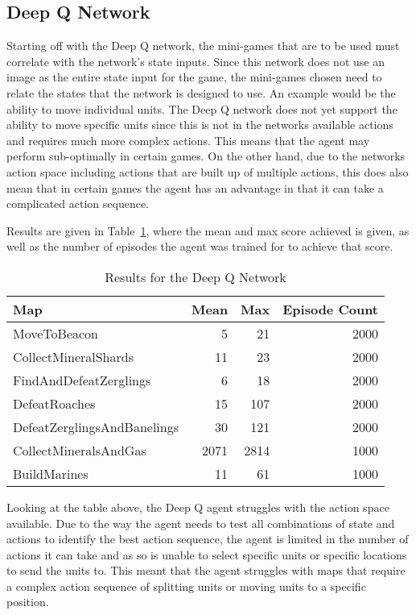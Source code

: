 \subsection{Deep Q Network}

Starting off with the Deep Q network, the mini-games that are to be used must
correlate with the network's state inputs. Since this network does not use an
image as the entire state input for the game, the mini-games chosen need to
relate the states that the network is designed to use. An example would be the
ability to move individual units. The Deep Q network does not yet support the
ability to move specific units since this is not in the networks available
actions and requires much more complex actions. This means that the agent may
perform sub-optimally in certain games. On the other hand, due to the networks
action space including actions that are built up of multiple actions, this does
also mean that in certain games the agent has an advantage in that it can take a
complicated action sequence.

Results are given in Table~\ref{tab:dqn_results}, where the mean and max score
achieved is given, as well as the number of episodes the agent was trained for
to achieve that score.

\begin{table}[h]
    \centering
    \begin{tabular}{@{}lrrr@{}}
        \toprule
        Map                         & Mean & Max  & Episode Count \\ \midrule
        MoveToBeacon                & 5    & 21   & 2000          \\
        CollectMineralShards        & 11   & 23   & 2000          \\
        FindAndDefeatZerglings      & 6    & 18   & 2000          \\
        DefeatRoaches               & 15   & 107  & 2000          \\
        DefeatZerglingsAndBanelings & 30   & 121  & 2000          \\
        CollectMineralsAndGas       & 2071 & 2814 & 1000          \\
        BuildMarines                & 11   & 61   & 1000          \\ \bottomrule
    \end{tabular}
    \caption{Results for the Deep Q Network}%
    \label{tab:dqn_results}%
\end{table}

Looking at the table above, the Deep Q agent struggles with the action space
available. Due to the way the agent needs to test all combinations of state and
actions to identify the best action sequence, the agent is limited in the number
of actions it can take and as so is unable to select specific units or
specific locations to send the units to. This meant that the agent struggles
with maps that require a complex action sequence of splitting units or moving
units to a specific position.

